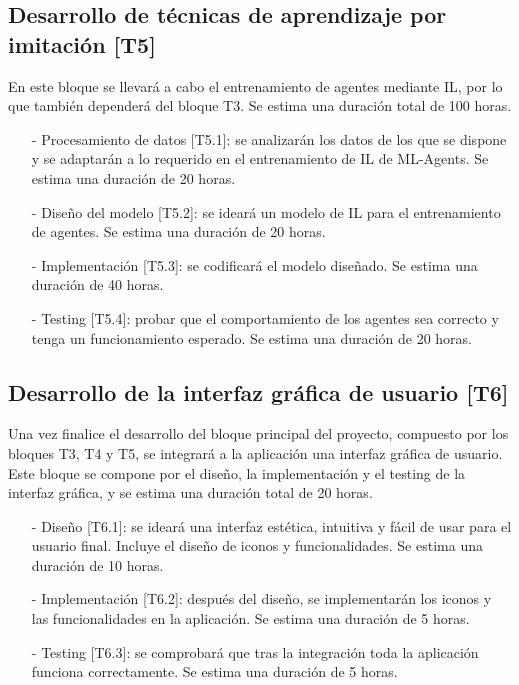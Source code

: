 \subsection{Desarrollo de técnicas de aprendizaje por imitación [T5]}
En este bloque se llevará a cabo el entrenamiento de agentes mediante IL, por lo que también dependerá del bloque T3. Se estima una duración total de 100 horas.
\begin{enumerate}
    \item[-] Procesamiento de datos [T5.1]: se analizarán los datos de los que se dispone y se adaptarán a lo requerido en el entrenamiento de IL de ML-Agents. Se estima una duración de 20 horas.%
    \item[-] Diseño del modelo [T5.2]: se ideará un modelo de IL para el entrenamiento de agentes. Se estima una duración de 20 horas. %
    \item[-] Implementación [T5.3]: se codificará el modelo diseñado. Se estima una duración de 40 horas. %
    \item[-] Testing [T5.4]: probar que el comportamiento de los agentes sea correcto y tenga un funcionamiento esperado. Se estima una duración de 20 horas. %
\end{enumerate}

\subsection{Desarrollo de la interfaz gráfica de usuario [T6]}
Una vez finalice el desarrollo del bloque principal del proyecto, compuesto por los bloques T3, T4 y T5, se integrará a la aplicación una interfaz gráfica de usuario. Este bloque se compone por el diseño, la implementación y el testing de la interfaz gráfica, y se estima una duración total de 20 horas.

\begin{enumerate}
    \item[-] Diseño [T6.1]: se ideará una interfaz estética, intuitiva y fácil de usar para el usuario final. Incluye el diseño de iconos y funcionalidades. Se estima una duración de 10 horas.  %
    \item[-] Implementación [T6.2]: después del diseño, se implementarán los iconos y las funcionalidades en la aplicación. Se estima una duración de 5 horas.%
    \item[-] Testing [T6.3]: se comprobará que tras la integración toda la aplicación funciona correctamente. Se estima una duración de 5 horas. %
\end{enumerate}

